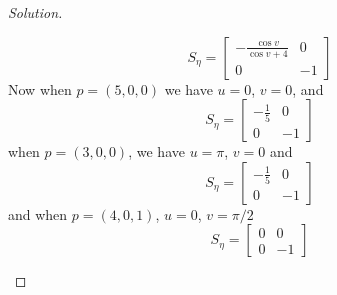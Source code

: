 \documentclass[a4paper]{article}
\begin{document}
\begin{proof}[Solution]
\begin{enumerate}[(a)]
      \[
        S_\eta = 
        \begin{bmatrix}
          - \frac{\cos v}{\cos v + 4} & 0 \\
          0 & -1
        \end{bmatrix}
      \]
      Now when $p = (5,0,0)$ we have $u = 0$, $v = 0$, and
      \[
        S_\eta = 
        \begin{bmatrix}
          -\frac{1}{5} & 0 \\
          0 & -1
        \end{bmatrix}
      \]
      when $p = (3,0,0)$, we have $u = \pi$, $v = 0$ and
      \[
        S_\eta = 
        \begin{bmatrix}
          - \frac{1}{5} & 0 \\
          0 & -1
        \end{bmatrix}
      \]
      and when $p = (4, 0, 1)$, $u = 0$, $v = \pi/2$
      \[
        S_\eta = 
        \begin{bmatrix}
          0 & 0 \\
          0 & -1
        \end{bmatrix}
      \]
  \end{enumerate}
\end{proof}
\end{document}
